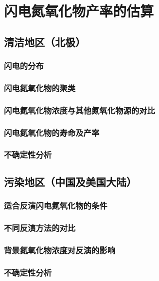 \chapter{闪电氮氧化物产率的估算}

\section{清洁地区（北极）}

\subsection{闪电的分布}
\subsection{闪电氮氧化物的聚类}
\subsection{闪电氮氧化物浓度与其他氮氧化物源的对比}
\subsection{闪电氮氧化物的寿命及产率}
\subsection{不确定性分析}


\section{污染地区（中国及美国大陆）}

\subsection{适合反演闪电氮氧化物的条件}
\subsection{不同反演方法的对比}
\subsection{背景氮氧化物浓度对反演的影响}
\subsection{不确定性分析}
